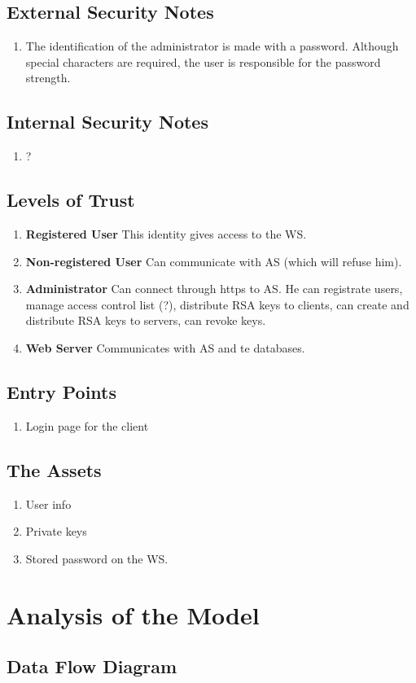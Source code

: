 \documentclass[11pt]{article}
\begin{document}
\subsection{External Security Notes}
\begin{enumerate}
	\item The identification of the administrator is made with a password. Although special characters are required, the user is responsible for the password strength.
\end{enumerate}

\subsection{Internal Security Notes}
\begin{enumerate}
	\item ?
\end{enumerate}

\subsection{Levels of Trust}
\begin{enumerate}
	\item\textbf{Registered User} This identity gives access to the WS.
	\item\textbf{Non-registered User} Can communicate with AS (which will refuse him).
	\item\textbf{Administrator} Can connect through https to AS. He can registrate users, manage access control list (?), distribute RSA keys to clients, can create and distribute RSA keys to servers, can revoke keys.
	\item\textbf{Web Server} Communicates with AS and te databases.
\end{enumerate}

\subsection{Entry Points}
\begin{enumerate}
	\item Login page for the client
\end{enumerate}

\subsection{The Assets}
\begin{enumerate}
	\item User info
	\item Private keys
	\item Stored password on the WS.
\end{enumerate}

\section{Analysis of the Model}

\subsection{Data Flow Diagram}
\end{document}
